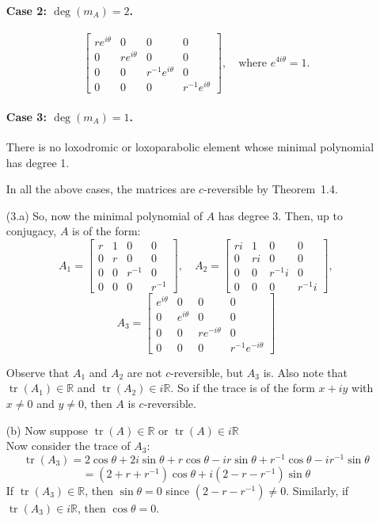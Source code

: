 \documentclass[11pt]{amsart}
\numberwithin{equation}{section}
\theoremstyle{plain}
\theoremstyle{definition}
\numberwithin{equation}{section}
\begin{document}
\begin{enumerate}
\paragraph{Case 2: \( \deg(m_A) = 2 \).}
\[
\begin{bmatrix}
re^{i\theta} & 0 & 0 & 0\\
0 & re^{i\theta} & 0 & 0\\
0 & 0 & r^{-1}e^{i\theta} & 0\\
0 & 0 & 0 & r^{-1}e^{i\theta}
\end{bmatrix}, \quad \text{where } e^{4i\theta} = 1.
\]

\paragraph{Case 3: \( \deg(m_A) = 1 \).} 
There is no loxodromic or loxoparabolic element whose minimal polynomial has degree 1.

In all the above cases, the matrices are \( c \)-reversible by Theorem~1.4.
 \item[(3.a)]
So, now  the minimal polynomial of \( A \) has degree 3. Then, up to conjugacy, \( A \) is of the form:
\[
A_1 =
\begin{bmatrix}
r & 1 & 0 & 0\\
0 & r & 0 & 0\\
0 & 0 & r^{-1} & 0\\
0 & 0 & 0 & r^{-1}
\end{bmatrix}, \quad
A_2 =
\begin{bmatrix}
ri & 1 & 0 & 0\\
0 & ri & 0 & 0\\
0 & 0 & r^{-1}i & 0\\
0 & 0 & 0 & r^{-1}i
\end{bmatrix},
\]
\[
A_3 =
\begin{bmatrix}
e^{i\theta} & 0 & 0 & 0\\
0 & e^{i\theta} & 0 & 0\\
0 & 0 & re^{-i\theta} & 0\\
0 & 0 & 0 & r^{-1}e^{-i\theta}
\end{bmatrix}
\]

Observe that \( A_1 \) and \( A_2 \) are not \( c \)-reversible, but \( A_3 \) is. Also note that \( \operatorname{tr}(A_1) \in \mathbb{R} \) and \( \operatorname{tr}(A_2) \in i\mathbb{R} \). So if the trace is of the form \( x + iy \) with \( x \neq 0 \) and \( y \neq 0 \), then \( A \) is \( c \)-reversible. 

 \item[(b)] Now suppose \(\operatorname{tr}(A) \in \mathbb{R} \) or \(\operatorname{tr}(A) \in i\mathbb{R} \)
 \\Now consider the trace of \( A_3 \):
\[
\operatorname{tr}(A_3) = 2\cos\theta + 2i\sin\theta + r\cos\theta - ir\sin\theta + r^{-1}\cos\theta - ir^{-1}\sin\theta
\]
\[
= (2 + r + r^{-1})\cos\theta + i(2 - r - r^{-1})\sin\theta
\]
If \( \operatorname{tr}(A_3) \in \mathbb{R} \), then \( \sin\theta = 0 \) since \( (2 - r - r^{-1}) \neq 0 \). Similarly, if \( \operatorname{tr}(A_3) \in i\mathbb{R} \), then \( \cos\theta = 0 \).


\end{enumerate}
\end{document}

